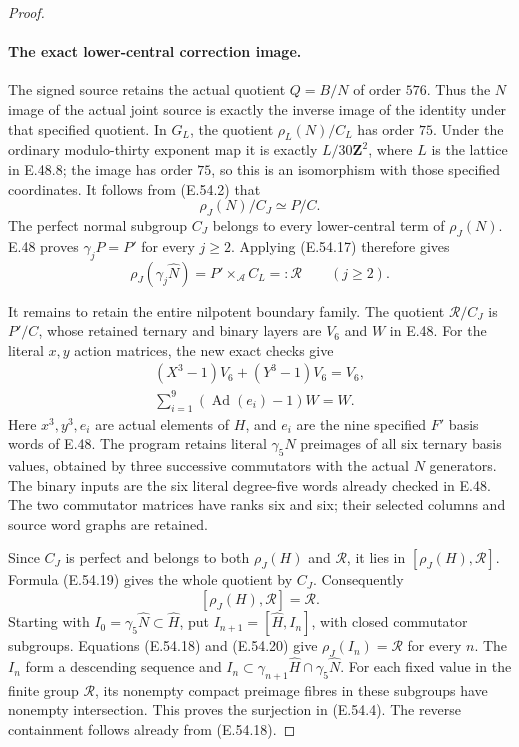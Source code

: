\begin{proof}
\paragraph{The exact lower-central correction image.}
The signed source retains the actual quotient $Q=B/N$ of
order $576$.  Thus the $N$ image of the actual joint source
is exactly the inverse image of the identity under that
specified quotient.  In $G_L$, the quotient
$\rho_L(N)/C_L$ has order $75$.  Under the ordinary
modulo-thirty exponent map it is exactly
$L/30\mathbf Z^2$, where $L$ is the lattice in E.48.8;
the image has order $75$, so this is an isomorphism with
those specified coordinates.
It follows from \textup{(E.54.2)} that
\[
       \rho_J(N)/C_J\simeq P/C.
 \tag{E.54.17}
\]
The perfect normal subgroup $C_J$ belongs to every
lower-central term of $\rho_J(N)$.  E.48 proves
$\gamma_jP=P'$ for every $j\ge2$.  Applying
\textup{(E.54.17)} therefore gives
\[
       \rho_J(\gamma_j\widehat N)
          =P'\times_{\mathcal A}C_L=:\mathcal R
                       \qquad(j\ge2).
 \tag{E.54.18}
\]

It remains to retain the entire nilpotent boundary family.
The quotient $\mathcal R/C_J$ is $P'/C$, whose retained
ternary and binary layers are $V_6$ and $W$ in E.48.
For the literal $x,y$ action matrices, the new exact checks
give
\[
 \begin{gathered}
    (X^3-1)V_6+(Y^3-1)V_6=V_6,\\
    \sum_{i=1}^{9}(\operatorname{Ad}(e_i)-1)W=W.
 \end{gathered}
 \tag{E.54.19}
\]
Here $x^3,y^3,e_i$ are actual elements of $H$, and $e_i$
are the nine specified $F'$ basis words of E.48.  The
program retains literal $\gamma_5N$ preimages of all six
ternary basis values, obtained by three successive
commutators with the actual $N$ generators.  The binary
inputs are the six literal degree-five words already
checked in E.48.  The two commutator matrices have ranks
six and six; their selected columns and source word graphs
are retained.

Since $C_J$ is perfect and belongs to both $\rho_J(H)$ and
$\mathcal R$, it lies in $[\rho_J(H),\mathcal R]$.
Formula \textup{(E.54.19)} gives the whole quotient by
$C_J$.  Consequently
\[
                  [\rho_J(H),\mathcal R]=\mathcal R.
 \tag{E.54.20}
\]
Starting with $I_0=\gamma_5\widehat N\subset\widehat H$,
put $I_{n+1}=[\widehat H,I_n]$, with closed commutator
subgroups.  Equations \textup{(E.54.18)} and
\textup{(E.54.20)} give $\rho_J(I_n)=\mathcal R$ for every
$n$.  The $I_n$ form a descending sequence and
$I_n\subset\gamma_{n+1}\widehat H\cap\gamma_5\widehat N$.
For each fixed value in the finite group $\mathcal R$,
its nonempty compact preimage fibres in these subgroups
have nonempty intersection.  This proves the surjection
in \textup{(E.54.4)}.  The reverse containment follows
already from \textup{(E.54.18)}.


\end{proof}
